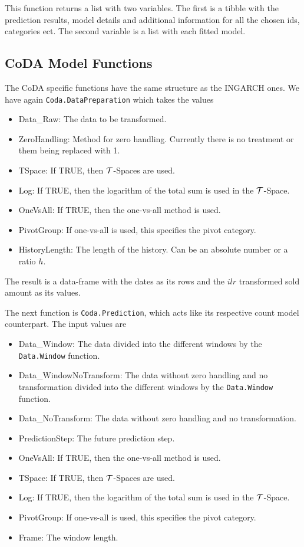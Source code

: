 This function returns a list with two variables. The first is a tibble with the prediction results, model details and additional information for all the chosen ids, categories ect. The second variable is a list with each fitted model. 

\subsection{CoDA Model Functions}
\label{sec:Coda Model Functions}

The CoDA specific functions have the same structure as the INGARCH ones. We have again \texttt{Coda.DataPreparation} which takes the values

\begin{itemize}
  \item Data\_Raw: The data to be transformed.
  \item ZeroHandling: Method for zero handling.  Currently there is no treatment or them being replaced with 1. 
  \item TSpace: If TRUE, then $\mathcal{T}$-Spaces are used.
  \item Log: If TRUE, then the logarithm of the total sum is used in the $\mathcal{T}$-Space.
  \item OneVsAll: If TRUE, then the one-vs-all method is used.
  \item PivotGroup: If one-vs-all is used, this specifies the pivot category.
  \item HistoryLength: The length of the history. Can be an absolute number or a ratio $h$.
\end{itemize}

The result is a data-frame with the dates as its rows and the $ilr$ transformed sold amount as its values.

The next function is \texttt{Coda.Prediction}, which acts like its respective count model counterpart. The input values are 

\begin{itemize}
	\item Data\_Window: The data divided into the different windows by the \texttt{Data.Window} function.
	\item Data\_WindowNoTransform: The data without zero handling and no transformation divided into the different windows by the \texttt{Data.Window} function.
	\item Data\_NoTransform: The data without zero handling and no transformation.
	\item PredictionStep: The future prediction step.
	\item OneVsAll: If TRUE, then the one-vs-all method is used.
	\item TSpace: If TRUE, then $\mathcal{T}$-Spaces are used.
	\item Log: If TRUE, then the logarithm of the total sum is used in the $\mathcal{T}$-Space.
	\item PivotGroup: If one-vs-all is used, this specifies the pivot category.
	\item Frame: The window length.
\end{itemize}

